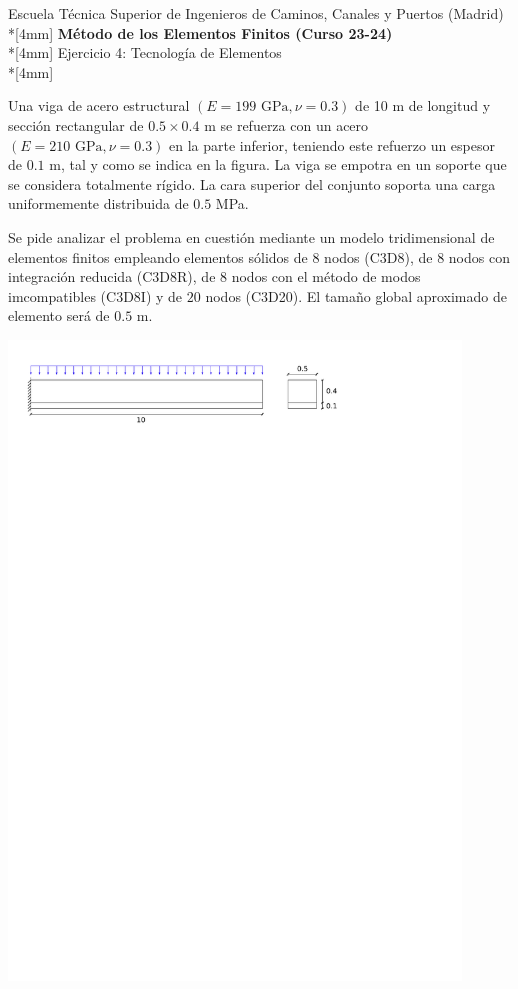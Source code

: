 \documentclass[a4paper,12pt]{article}
\begin{document}
\mbox{}\vspace*{-45mm}

{\centering
{\small\sc Escuela Técnica Superior de Ingenieros de Caminos, Canales y
Puertos (Madrid)}\\*[4mm]
{\Large\bf Método de los Elementos Finitos (Curso 23-24)}\\*[4mm]
Ejercicio 4: Tecnología de Elementos\\*[4mm]

}

\vspace{3mm}

Una viga de acero estructural $(E=199 \textrm{ GPa}, \nu=0.3)$ de 10 m de longitud y sección rectangular de $0.5 \times 0.4$ m se refuerza con un acero $(E=210 \textrm{ GPa},\nu=0.3)$ en la parte inferior, teniendo este refuerzo un espesor de $0.1$ m, tal y como se indica en la figura. La viga se empotra en un soporte que se considera totalmente rígido. La cara superior del conjunto soporta una carga  uniformemente distribuida de $0.5$ MPa.

Se pide analizar el problema en cuestión mediante un modelo tridimensional de elementos finitos empleando elementos sólidos de $8$ nodos (C3D8), de $8$ nodos con integración reducida (C3D8R), de $8$ nodos con el método de modos imcompatibles (C3D8I) y de $20$ nodos (C3D20). El tamaño global aproximado de elemento será de $0.5$ m.

\vspace{5mm}
\begin{center}
	\includegraphics[width=0.9\textwidth]{Ejercicio4_2023-1.pdf}
\end{center}
\end{document}
